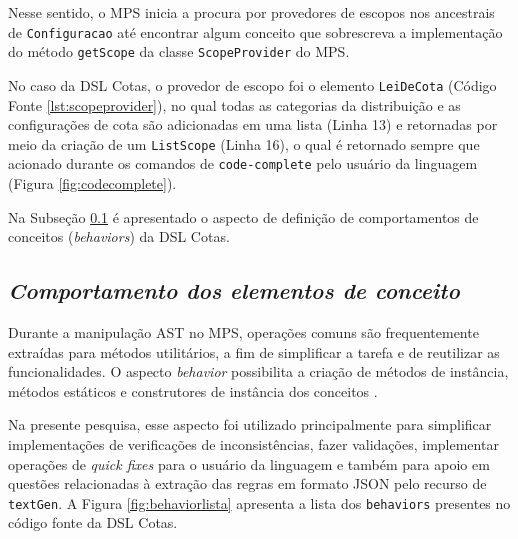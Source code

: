

\newpage

Nesse sentido, o \gls{MPS} inicia a procura por provedores de escopos nos ancestrais de \texttt{Configuracao} até encontrar algum conceito que sobrescreva a implementação do método \texttt{getScope} da classe \texttt{ScopeProvider} do \gls{MPS}. 

No caso da DSL Cotas, o provedor de escopo foi o elemento \texttt{LeiDeCota} (Código Fonte \ref{lst:scopeprovider}), no qual todas as categorias da distribuição e as configurações de cota são adicionadas em uma lista (Linha 13) e retornadas por meio da criação de um \texttt{ListScope} (Linha 16), o qual é retornado sempre que acionado durante os comandos de \texttt{code-complete} pelo usuário da linguagem (Figura \ref{fig:codecomplete}).





Na Subseção \ref{sub:sec:comportamentos} é apresentado o aspecto de definição de comportamentos de conceitos (\textit{behaviors}) da DSL Cotas.


\subsection{\textit{Comportamento dos elementos de conceito}}
\label{sub:sec:comportamentos}

Durante a manipulação \gls{AST} no \gls{MPS}, operações comuns são frequentemente extraídas para métodos utilitários, a fim de simplificar a tarefa e de reutilizar as funcionalidades. O aspecto \textit{behavior} possibilita a criação de métodos de instância, métodos estáticos e construtores de instância dos conceitos \cite{jetbrains}.

Na presente pesquisa, esse aspecto foi utilizado principalmente para simplificar implementações de verificações de inconsistências, fazer validações, implementar operações de \textit{quick fixes} para o usuário da linguagem e também para apoio em questões relacionadas à extração das regras em formato JSON pelo recurso de \texttt{textGen}. A Figura \ref{fig:behaviorlista} apresenta a lista dos \texttt{behaviors} presentes no código fonte da DSL Cotas.



